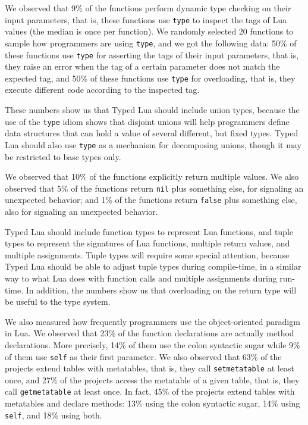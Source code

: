 \documentclass[preprint]{sig-alternate}
\begin{document}
We observed that 9\% of the functions perform dynamic type checking
on their input parameters, that is, these functions use \verb'type'
to inspect the tags of Lua values (the median is once per function).
We randomly selected 20 functions to sample how programmers are
using \verb'type', and we got the following data:
50\% of these functions use \verb'type' for asserting the tags of
their input parameters, that is, they raise an error when the tag of a
certain parameter does not match the expected tag, and
50\% of these functions use \verb'type' for overloading, that is,
they execute different code according to the inspected tag.

These numbers show us that Typed Lua should include union types,
because the use of the \verb'type' idiom shows that disjoint unions
will help programmers define data structures that can hold a value of
several different, but fixed types.
Typed Lua should also use \verb'type' as a mechanism for decomposing
unions, though it may be restricted to base types only.

We observed that 10\% of the functions explicitly return multiple
values.
We also observed that 5\% of the functions return \verb'nil' plus
something else, for signaling an unexpected behavior;
and 1\% of the functions return \verb'false' plus something else,
also for signaling an unexpected behavior.

Typed Lua should include function types to represent Lua functions,
and tuple types to represent the signatures of Lua functions,
multiple return values, and multiple assignments.
Tuple types will require some special attention, because Typed Lua
should be able to adjust tuple types during compile-time, in a
similar way to what Lua does with function calls and multiple
assignments during run-time.
In addition, the numbers show us that overloading on the return
type will be useful to the type system.

We also measured how frequently programmers use the object-oriented
paradigm in Lua.
We observed that 23\% of the function declarations are actually
method declarations.
More precisely, 14\% of them use the colon syntactic sugar while
9\% of them use \verb'self' as their first parameter.
We also observed that 63\% of the projects extend tables with
metatables, that is, they call \verb'setmetatable' at least once,
and 27\% of the projects access the metatable of a given table,
that is, they call \verb'getmetatable' at least once.
In fact, 45\% of the projects extend tables with metatables and
declare methods:
13\% using the colon syntactic sugar, 14\% using \verb'self', and
18\% using both.
\end{document}
